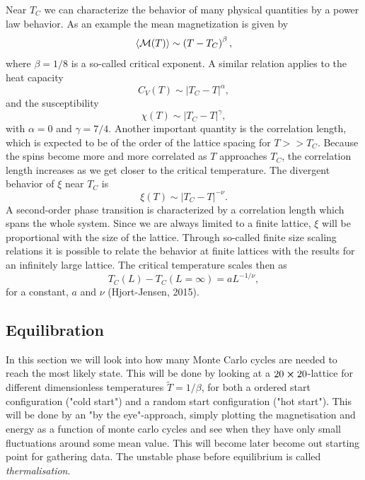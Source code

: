 \documentclass[11pt,a4paper,english,draft]{article}
\numberwithin{equation}{section}
\begin{document}
Near $T_C$ we can characterize the behavior of many physical quantities
by a power law behavior.
As an example the mean magnetization is given by
\begin{equation}
  \langle {\cal M}(T) \rangle \sim \left(T-T_C\right)^{\beta},
\end{equation}
where $\beta=1/8$ is a so-called critical exponent. A similar relation
applies to the heat capacity 
\begin{equation}
  C_V(T) \sim \left|T_C-T\right|^{\alpha},
\end{equation}
and the susceptibility
\begin{equation}
  \chi(T) \sim \left|T_C-T\right|^{\gamma},
\end{equation}
with $\alpha = 0$ and $\gamma = 7/4$.
Another important quantity is the correlation length, which is expected
to be of the order of the lattice spacing for $T>> T_C$. Because the spins
become more and more correlated as $T$ approaches $T_C$, the correlation
length increases as we get closer to the critical temperature. The divergent
behavior of $\xi$ near $T_C$ 
is
\begin{equation}
  \xi(T) \sim \left|T_C-T\right|^{-\nu}.
  \label{eq:xi}
\end{equation}
A second-order phase transition is characterized by a
correlation length which spans the whole system.
Since we are always limited to a finite lattice, $\xi$ will
be proportional with the size of the lattice. 
Through so-called finite size scaling relations
it is possible to relate the behavior at finite lattices with the 
results for an infinitely large lattice.
The critical temperature scales then as
\begin{equation}
 T_C(L)-T_C(L=\infty) = aL^{-1/\nu},
 \label{eq:tc}
\end{equation}
for a constant, $a$ and  $\nu$ (Hjort-Jensen, 2015). 


\subsection{Equilibration}
In this section we will look into how many Monte Carlo cycles are needed 
to reach the most likely state. This will be done by looking at a 
$20 \cross 20$-lattice for different dimensionless temperatures 
$\tilde{T}=1/\beta$, for both a ordered start configuration ("cold start") 
and a random start configuration ("hot start"). 
This will be done by an "by the eye"-approach, simply plotting the 
magnetisation and energy as a function of monte carlo cycles and see 
when they have only small fluctuations around some mean value. This will 
become later become out starting point for gathering data. The unstable 
phase before equilibrium is called \emph{thermalisation}.
\end{document}
